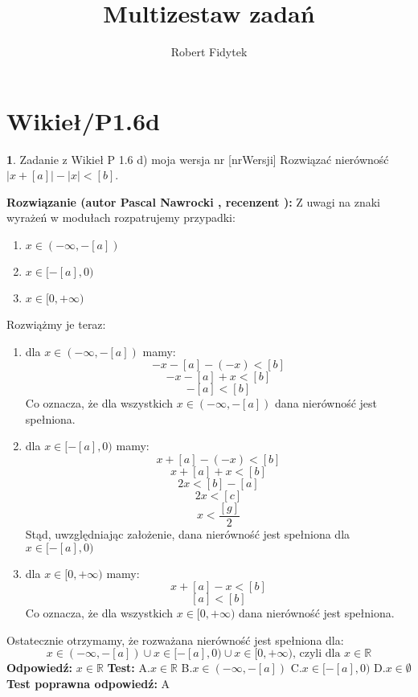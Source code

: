 \documentclass[12pt, a4paper]{article}
\title{Multizestaw zadań}
\author{Robert Fidytek}
\date{}
\theoremstyle{definition} %
\newtheorem{zad}{}
\newcommand{\kategoria}[1]{\section{#1}} %
\newcommand{\zadStart}[1]{\begin{zad}#1\newline} %
\newcommand{\zadStop}{\end{zad}}   %
\newcommand{\rozwStart}[2]{\noindent \textbf{Rozwiązanie (autor #1 , recenzent #2): }\newline} %
\newcommand{\rozwStop}{\newline}                                            %
\newcommand{\odpStart}{\noindent \textbf{Odpowiedź:}\newline}    %
\newcommand{\odpStop}{\newline}                                             %
\newcommand{\testStart}{\noindent \textbf{Test:}\newline} %
\newcommand{\testStop}{\newline} %
\newcommand{\kluczStart}{\noindent \textbf{Test poprawna odpowiedź:}\newline} %
\newcommand{\kluczStop}{\newline} %
\begin{document}
\maketitle


\kategoria{Wikieł/P1.6d}
\zadStart{Zadanie z Wikieł P 1.6 d) moja wersja nr [nrWersji]}
Rozwiązać nierówność $|x+[a]|-|x|<[b]$.
\zadStop
\rozwStart{Pascal Nawrocki}{}
Z uwagi na znaki wyrażeń w modułach rozpatrujemy przypadki:
\begin{enumerate}
\item$x\in(-\infty,-[a])$
\item$x\in[-[a],0)$
\item$x\in[0,+\infty)$
\end{enumerate}
Rozwiążmy je teraz:
\begin{enumerate}
\item dla $x\in(-\infty,-[a])$
 mamy: 
$$ -x-[a]-(-x)<[b]$$
$$ -x-[a]+x<[b]$$
$$ -[a]<[b]$$
Co oznacza, że dla wszystkich $x\in(-\infty,-[a])$ dana nierówność jest spełniona.
\item dla $x\in[-[a],0)$
mamy:
$$x+[a]-(-x)<[b]$$
$$x+[a]+x<[b]$$
$$2x<[b]-[a]$$
$$2x<[c]$$
$$x<\frac{[g]}{2}$$
Stąd, uwzględniając założenie, dana nierówność jest spełniona dla $x\in[-[a],0)$
\item dla $x\in[0,+\infty)$
mamy:
$$x+[a]-x<[b]$$
$$[a]<[b]$$
Co oznacza, że dla wszystkich $x\in[0,+\infty)$ dana nierówność jest spełniona.
\end{enumerate}
Ostatecznie otrzymamy, że rozważana nierówność jest spełniona dla: 
$$x\in(-\infty,-[a])\cup x\in[-[a],0)\cup x\in[0,+\infty)  \text{, czyli dla } x\in \mathbb{R}$$
\rozwStop
\odpStart
$ x\in \mathbb{R}$
\odpStop
\testStart
A.$x\in \mathbb{R}$
B.$x\in(-\infty,-[a])$
C.$x\in[-[a],0)$
D.$x\in \emptyset$
\testStop
\kluczStart
A
\kluczStop
\end{document}
